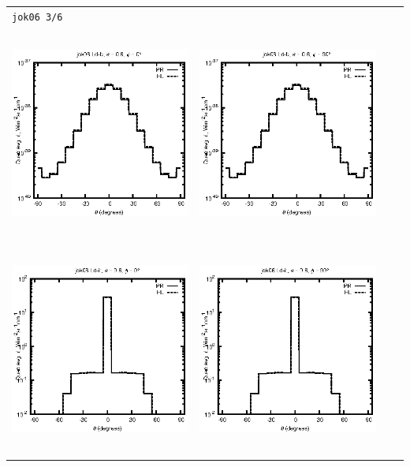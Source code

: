 \documentclass[10pt,a4paper]{article}
\begin{document}
\begin{adjustwidth}{-1.2in}{-1.2in}
\begin{tabular}{c c c c}
\multicolumn{4}{l}{\texttt{jok06 3/6}} \\
\includegraphics[height=7cm]{../eps/jok06_Ld_b_fwd.eps} &
\includegraphics[height=7cm]{../eps/jok06_Ld_b_cross.eps} \\
\includegraphics[height=7cm]{../eps/jok06_Ld_it_fwd.eps} &
\includegraphics[height=7cm]{../eps/jok06_Ld_it_cross.eps} \\

\end{tabular}
\end{adjustwidth}
\end{document}
